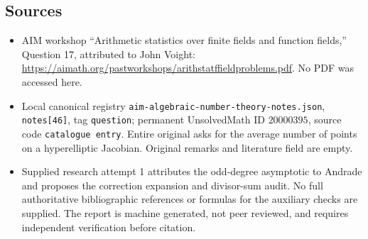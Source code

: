 \documentclass[11pt]{article}
\begin{document}
\subsection{Sources}
\begin{itemize}
\item AIM workshop ``Arithmetic statistics over finite fields and function fields,'' Question 17, attributed to John Voight: \url{https://aimath.org/pastworkshops/arithstatffieldproblems.pdf}. No PDF was accessed here.
\item Local canonical registry \texttt{aim-algebraic-number-theory-notes.json}, \texttt{notes[46]}, tag \texttt{question}; permanent UnsolvedMath ID \(20000395\), source code \texttt{catalogue entry}. Entire original asks for the average number of points on a hyperelliptic Jacobian. Original remarks and literature field are empty.
\item Supplied research attempt 1 attributes the odd-degree asymptotic to Andrade and proposes the correction expansion and divisor-sum audit. No full authoritative bibliographic references or formulas for the auxiliary checks are supplied. The report is machine generated, not peer reviewed, and requires independent verification before citation.
\end{itemize}
\end{document}
